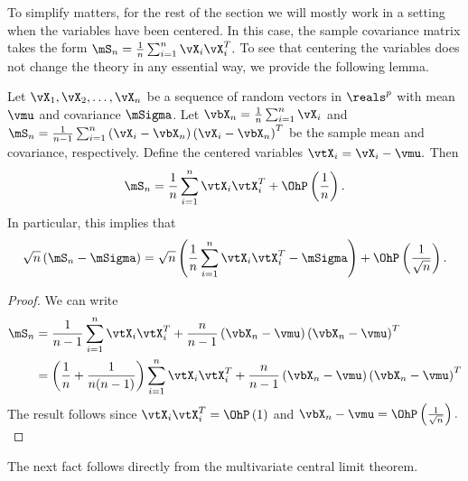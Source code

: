 To simplify matters, for the rest of the section we will mostly work in a setting when the variables have been centered.  In this case, the sample covariance matrix takes the form
\(
    \mS_n = \frac{1}{n} \sum_{i=1}^n \vX_i \vX_i^T.
\)
To see that centering the variables does not change the theory in any essential way, we provide the following lemma.

\begin{lemma}
Let $\vX_1, \vX_2, \ldots, \vX_n$ be a sequence of random vectors in $\reals^p$ with mean $\vmu$ and covariance $\mSigma$.  Let
\(
    \vbX_n = \frac{1}{n} \sum_{i=1}^n \vX_i
\)
and
\(
    \mS_n
    =
    \frac{1}{n-1}
    \sum_{i=1}^n
        \left( \vX_i - \vbX_n \right)
        \left( \vX_i - \vbX_n \right)^T
\)
be the sample mean and covariance, respectively.  Define the centered
variables
\(
    \vtX_i = \vX_i - \vmu.
\)
Then
\[
    \mS_n
    =
    \frac{1}{n}
    \sum_{i=1}^n
        \vtX_i \vtX_i^T
    +
    \OhP\left( \frac{1}{n} \right).
\]
In particular, this implies that
\[
    \sqrt{n}
    \left(
        \mS_n - \mSigma
    \right)
    =
    \sqrt{n}
    \left(
        \frac{1}{n}
        \sum_{i=1}^n
            \vtX_i \vtX_i^T
        -
        \mSigma
    \right)
    + 
    \OhP \left( \frac{1}{\sqrt{n}} \right).
\]
\end{lemma}
\begin{proof}
We can write
\begin{align*}
    \mS_n &= \frac{1}{n-1}
             \sum_{i=1}^n \vtX_i \vtX_i^T
             +
             \frac{n}{n-1}
             \left(
                \vbX_n - \vmu
             \right)
             \left(
                \vbX_n - \vmu
             \right)^T \\
          &= \left(
                \frac{1}{n}
                +
                \frac{1}{n (n-1) }
             \right)
             \sum_{i=1}^n \vtX_i \vtX_i^T
             +
             \frac{n}{n-1}
             \left(
                \vbX_n - \vmu
             \right)
             \left(
                \vbX_n - \vmu
             \right)^T
\end{align*}
The result follows since
\(
    \vtX_i \vtX_i^T = \OhP \left( 1 \right)
\)
and
\(
    \vbX_n - \vmu 
    = 
    \OhP \left( \frac{1}{ \sqrt{n} } \right).
\)

\end{proof}

The next fact follows directly from the multivariate central limit theorem.

